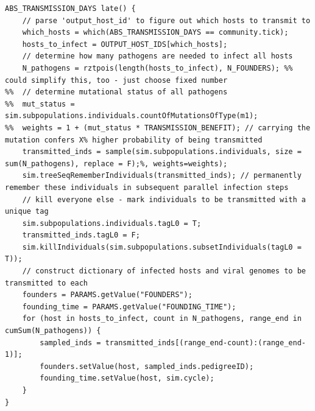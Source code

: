 \documentclass[12pt]{article}
\begin{document}
\begin{verbatim}
ABS_TRANSMISSION_DAYS late() {
	// parse 'output_host_id' to figure out which hosts to transmit to
	which_hosts = which(ABS_TRANSMISSION_DAYS == community.tick);
	hosts_to_infect = OUTPUT_HOST_IDS[which_hosts];
	// determine how many pathogens are needed to infect all hosts
	N_pathogens = rztpois(length(hosts_to_infect), N_FOUNDERS); %% could simplify this, too - just choose fixed number
%%	// determine mutational status of all pathogens
%%	mut_status = sim.subpopulations.individuals.countOfMutationsOfType(m1);
%%	weights = 1 + (mut_status * TRANSMISSION_BENEFIT); // carrying the mutation confers X% higher probability of being transmitted
	transmitted_inds = sample(sim.subpopulations.individuals, size = sum(N_pathogens), replace = F);%, weights=weights);
	sim.treeSeqRememberIndividuals(transmitted_inds); // permanently remember these individuals in subsequent parallel infection steps
	// kill everyone else - mark individuals to be transmitted with a unique tag
	sim.subpopulations.individuals.tagL0 = T;
	transmitted_inds.tagL0 = F;
	sim.killIndividuals(sim.subpopulations.subsetIndividuals(tagL0 = T));
	// construct dictionary of infected hosts and viral genomes to be transmitted to each
	founders = PARAMS.getValue("FOUNDERS");
	founding_time = PARAMS.getValue("FOUNDING_TIME");
	for (host in hosts_to_infect, count in N_pathogens, range_end in cumSum(N_pathogens)) {
		sampled_inds = transmitted_inds[(range_end-count):(range_end-1)];
		founders.setValue(host, sampled_inds.pedigreeID);
		founding_time.setValue(host, sim.cycle);
	}
}
\end{verbatim}
\end{document}
